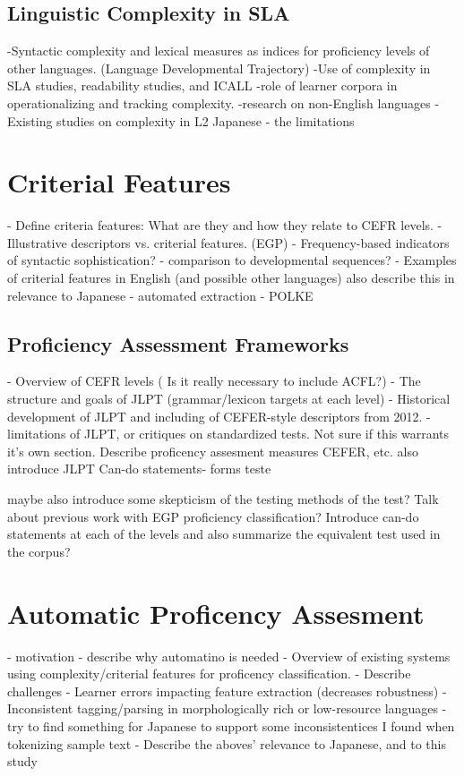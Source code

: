 \subsection{Linguistic Complexity in SLA}
-Syntactic complexity and lexical measures as indices for proficiency levels of other languages. (Language Developmental Trajectory)
-Use of complexity in SLA studies, readability studies, and ICALL
-role of learner corpora in operationalizing and tracking complexity.
-research on non-English languages
-Existing studies on complexity in L2 Japanese - the limitations



\section{Criterial Features}
- Define criteria features: What are they and how they relate to CEFR levels.
- Illustrative descriptors vs. criterial features. (EGP)
- Frequency-based indicators of syntactic sophistication? \cite{Ellis2004}
    - comparison to developmental sequences?
- Examples of criterial features in English (and possible other languages) also describe this in relevance to Japanese
- automated extraction - POLKE


\subsection{Proficiency Assessment Frameworks}
- Overview of CEFR levels ( Is it really necessary to include ACFL?)
- The structure and goals of JLPT (grammar/lexicon targets at each level)
- Historical development of JLPT and including of CEFER-style descriptors from 2012.
- limitations of JLPT, or critiques on standardized tests.
Not sure if this warrants it's own section. Describe proficency assesment measures CEFER, etc. also introduce JLPT
Can-do statements- forms teste


maybe also introduce some skepticism of the testing methods of the test?
Talk about previous work with EGP proficiency classification?
Introduce can-do statements at each of the levels and also summarize the equivalent test used in the corpus?


\section{Automatic Proficency Assesment}
- motivation - describe why automatino is needed
- Overview of existing systems using complexity/criterial features for proficency classification.
- Describe challenges
    - Learner errors impacting feature extraction (decreases robustness)
    -Inconsistent tagging/parsing in morphologically rich or low-resource languages
        -try to find something for Japanese to support some inconsistentices I found when tokenizing sample text
- Describe the aboves' relevance to Japanese, and to this study


